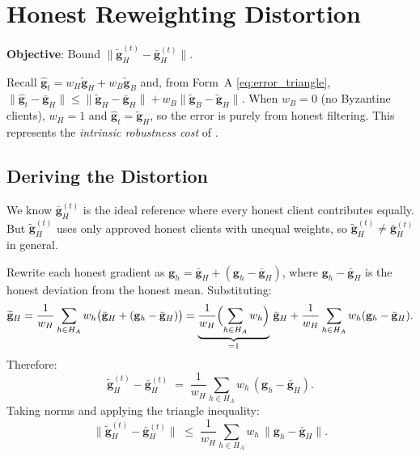 \documentclass[../main]{subfiles}
\begin{document}
\section{Honest Reweighting Distortion}
\label{app:honest_distortion}

\textbf{Objective}: Bound $\|\widetilde{\mathbf{g}}_H^{(t)} - \bar{\mathbf{g}}_H^{(t)}\|$.

Recall $\hat{\mathbf{g}}_t = w_H \widetilde{\mathbf{g}}_H + w_B \widetilde{\mathbf{g}}_B$ and, from Form~A
\eqref{eq:error_triangle},
$\|\hat{\mathbf{g}}_t - \bar{\mathbf{g}}_H\| \leq \|\widetilde{\mathbf{g}}_H - \bar{\mathbf{g}}_H\| + w_B\|\widetilde{\mathbf{g}}_B - \widetilde{\mathbf{g}}_H\|$.
When $w_B = 0$ (no Byzantine clients), $w_H = 1$ and
$\hat{\mathbf{g}}_t = \widetilde{\mathbf{g}}_H$, so the error is purely from honest filtering.
This represents the \emph{intrinsic robustness cost} of \aegis{}.

\subsection{Deriving the Distortion}

We know $\bar{\mathbf{g}}_H^{(t)}$ is the ideal reference where every honest client
contributes equally. But $\widetilde{\mathbf{g}}_H^{(t)}$ uses only approved honest clients
with unequal weights, so $\widetilde{\mathbf{g}}_H^{(t)} \neq \bar{\mathbf{g}}_H^{(t)}$ in general.

Rewrite each honest gradient as $\mathbf{g}_h = \bar{\mathbf{g}}_H + (\mathbf{g}_h - \bar{\mathbf{g}}_H)$,
where $\mathbf{g}_h - \bar{\mathbf{g}}_H$ is the honest deviation from the honest mean. Substituting:
\[
    \widetilde{\mathbf{g}}_H = \frac{1}{w_H}\sum_{h \in H_A} w_h\bigl(\bar{\mathbf{g}}_H + (\mathbf{g}_h - \bar{\mathbf{g}}_H)\bigr)
    = \underbrace{\frac{1}{w_H}\Bigl(\sum_{h \in H_A} w_h\Bigr)}_{=1}\,\bar{\mathbf{g}}_H
    + \frac{1}{w_H}\sum_{h \in H_A} w_h(\mathbf{g}_h - \bar{\mathbf{g}}_H).
\]
Therefore:
\begin{equation}
    \widetilde{\mathbf{g}}_H^{(t)} - \bar{\mathbf{g}}_H^{(t)} \;=\;
    \frac{1}{w_H}\sum_{h \in H_A} w_h\,(\mathbf{g}_h - \bar{\mathbf{g}}_H).
    \label{eq:honest_distortion}
\end{equation}
Taking norms and applying the triangle inequality:
\begin{equation}
    \|\widetilde{\mathbf{g}}_H^{(t)} - \bar{\mathbf{g}}_H^{(t)}\| \;\leq\;
    \frac{1}{w_H}\sum_{h \in H_A} w_h\,\|\mathbf{g}_h - \bar{\mathbf{g}}_H\|.
    \label{eq:honest_distortion_bound}
\end{equation}
\end{document}
